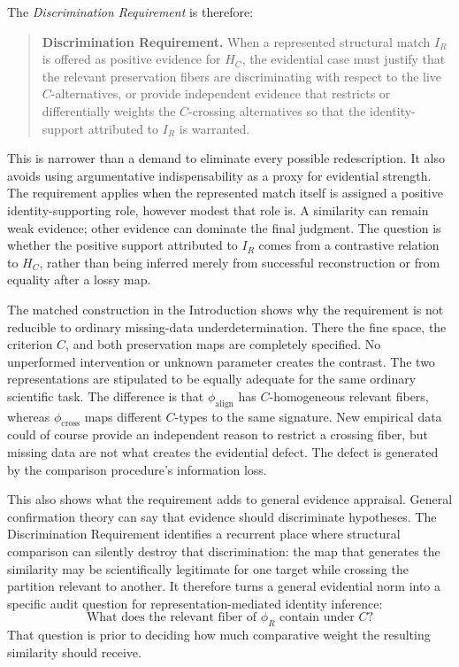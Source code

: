\documentclass[11pt]{article}
\begin{document}
The \emph{Discrimination Requirement} is therefore:

\begin{quote}
\textbf{Discrimination Requirement.} When a represented structural match \(I_R\) is offered as positive evidence for \(H_C\), the evidential case must justify that the relevant preservation fibers are discriminating with respect to the live \(C\)-alternatives, or provide independent evidence that restricts or differentially weights the \(C\)-crossing alternatives so that the identity-support attributed to \(I_R\) is warranted.
\end{quote}

This is narrower than a demand to eliminate every possible redescription. It also avoids using argumentative indispensability as a proxy for evidential strength. The requirement applies when the represented match itself is assigned a positive identity-supporting role, however modest that role is. A similarity can remain weak evidence; other evidence can dominate the final judgment. The question is whether the positive support attributed to \(I_R\) comes from a contrastive relation to \(H_C\), rather than being inferred merely from successful reconstruction or from equality after a lossy map.

The matched construction in the Introduction shows why the requirement is not reducible to ordinary missing-data underdetermination. There the fine space, the criterion \(C\), and both preservation maps are completely specified. No unperformed intervention or unknown parameter creates the contrast. The two representations are stipulated to be equally adequate for the same ordinary scientific task. The difference is that \(\phi_{\mathrm{align}}\) has \(C\)-homogeneous relevant fibers, whereas \(\phi_{\mathrm{cross}}\) maps different \(C\)-types to the same signature. New empirical data could of course provide an independent reason to restrict a crossing fiber, but missing data are not what creates the evidential defect. The defect is generated by the comparison procedure's information loss.

This also shows what the requirement adds to general evidence appraisal. General confirmation theory can say that evidence should discriminate hypotheses. The Discrimination Requirement identifies a recurrent place where structural comparison can silently destroy that discrimination: the map that generates the similarity may be scientifically legitimate for one target while crossing the partition relevant to another. It therefore turns a general evidential norm into a specific audit question for representation-mediated identity inference:
\[
\text{What does the relevant fiber of }\phi_R\text{ contain under }C?
\]
That question is prior to deciding how much comparative weight the resulting similarity should receive.
\end{document}
